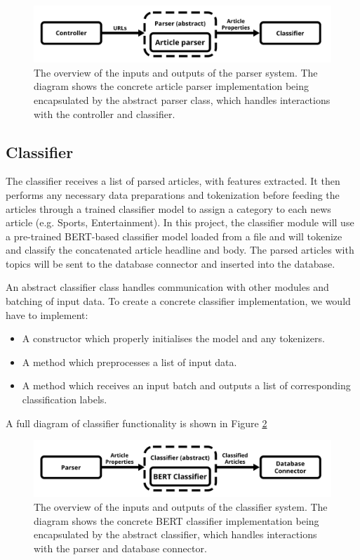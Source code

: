 \documentclass{l4proj}
\begin{document}
 \begin{figure}[h]
\centering
\includegraphics[width=\textwidth]{images/Parser-diagram.png}
\caption{The overview of the inputs and outputs of the parser system. The diagram shows the concrete article parser implementation being encapsulated by the abstract parser class, which handles interactions with the controller and classifier.}
\label{fig:parser_diagram}
\end{figure}

\subsection{Classifier}
The classifier receives a list of parsed articles, with features extracted. It then performs any necessary data preparations and tokenization before feeding the articles through a trained classifier model to assign a category to each news article (e.g. Sports, Entertainment). In this project, the classifier module will use a pre-trained BERT-based classifier model loaded from a file and will tokenize and classify the concatenated article headline and body. The parsed articles with topics will be sent to the database connector and inserted into the database. \par
An abstract classifier class handles communication with other modules and batching of input data. To create a concrete classifier implementation, we would have to implement:
\begin{itemize}
    \item A constructor which properly initialises the model and any tokenizers.
    \item A method which preprocesses a list of input data.
    \item A method which receives an input batch and outputs a list of corresponding classification labels.
\end{itemize}

A full diagram of classifier functionality is shown in Figure \ref{fig:classifier_diagram}

 \begin{figure}[h]
\centering
\includegraphics[width=\textwidth]{images/Classifier-diagram.png}
\caption{The overview of the inputs and outputs of the classifier system. The diagram shows the concrete BERT classifier implementation being encapsulated by the abstract classifier, which handles interactions with the parser and database connector.}
\label{fig:classifier_diagram}
\end{figure}
\end{document}
